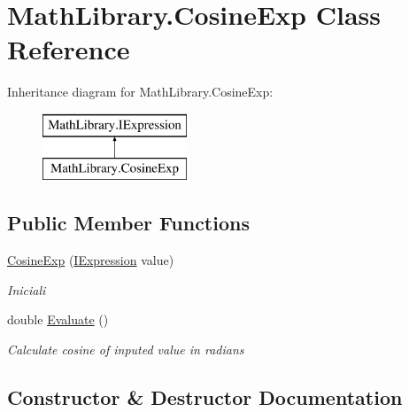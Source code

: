 \hypertarget{class_math_library_1_1_cosine_exp}{}\section{Math\+Library.\+Cosine\+Exp Class Reference}
\label{class_math_library_1_1_cosine_exp}
Inheritance diagram for Math\+Library.\+Cosine\+Exp\+:\begin{figure}[H]
\begin{center}
\leavevmode
\includegraphics[height=2.000000cm]{class_math_library_1_1_cosine_exp}
\end{center}
\end{figure}
\subsection*{Public Member Functions}
\begin{DoxyCompactItemize}
\item 
\mbox{\hyperlink{class_math_library_1_1_cosine_exp_a18cc1f454fa165c3abe00e6ea7c70e89}{Cosine\+Exp}} (\mbox{\hyperlink{interface_math_library_1_1_i_expression}{I\+Expression}} value)
\begin{DoxyCompactList}\small\item\em Iniciali \end{DoxyCompactList}\item 
double \mbox{\hyperlink{class_math_library_1_1_cosine_exp_a52b7c030eab112cfa56af87be60f1112}{Evaluate}} ()
\begin{DoxyCompactList}\small\item\em Calculate cosine of inputed value in radians \end{DoxyCompactList}\end{DoxyCompactItemize}


\subsection{Constructor \& Destructor Documentation}
\mbox{\label{class_math_library_1_1_cosine_exp_a18cc1f454fa165c3abe00e6ea7c70e89}} 
